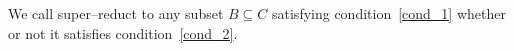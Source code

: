 \documentclass[authoryear,preprint,review,12pt]{elsarticle}
\begin{document}
  We call super--reduct to any subset $B \subseteq C$ satisfying condition~\ref{cond_1} whether or not it satisfies
  condition~\ref{cond_2}.
  
%  
%  
  
\end{document}
